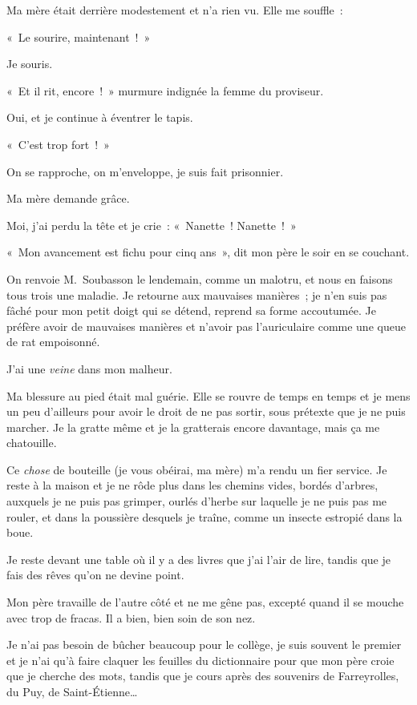 \documentclass[french,twoside]{book} %
\begin{document}
Ma mère était derrière modestement et n’a rien vu. Elle me souffle :\par
« Le sourire, maintenant ! »\par
Je souris.\par
« Et il rit, encore ! » murmure indignée la femme du proviseur.\par
Oui, et je continue à éventrer le tapis.\par
« C’est trop fort ! »\par
On se rapproche, on m’enveloppe, je suis fait prisonnier.\par
Ma mère demande grâce.\par
Moi, j’ai perdu la tête et je crie : « Nanette ! Nanette ! »\par
« Mon avancement est fichu pour cinq ans », dit mon père le soir en se couchant.\par
On renvoie M. Soubasson le lendemain, comme un malotru, et nous en faisons tous trois une maladie. Je retourne aux mauvaises manières ; je n’en suis pas fâché pour mon petit doigt qui se détend, reprend sa forme accoutumée. Je préfère avoir de mauvaises manières et n’avoir pas l’auriculaire comme une queue de rat empoisonné.\par
\bigbreak
\noindent J’ai une \emph{veine} dans mon malheur.\par
Ma blessure au pied était mal guérie. Elle se rouvre de temps en temps et je mens un peu d’ailleurs pour avoir le droit de ne pas sortir, sous prétexte que je ne puis marcher. Je la gratte même et je la gratterais encore davantage, mais ça me chatouille.\par
Ce\emph{ chose} de bouteille (je vous obéirai, ma mère) m’a rendu un fier service. Je reste à la maison et je ne rôde plus dans les chemins vides, bordés d’arbres, auxquels je ne puis pas grimper, ourlés d’herbe sur laquelle je ne puis pas me rouler, et dans la poussière desquels je traîne, comme un insecte estropié dans la boue.\par
Je reste devant une table où il y a des livres que j’ai l’air de lire, tandis que je fais des rêves qu’on ne devine point.\par
Mon père travaille de l’autre côté et ne me gêne pas, excepté quand il se mouche avec trop de fracas. Il a bien, bien soin de son nez.\par
Je n’ai pas besoin de bûcher beaucoup pour le collège, je suis souvent le premier et je n’ai qu’à faire claquer les feuilles du dictionnaire pour que mon père croie que je cherche des mots, tandis que je cours après des souvenirs de Farreyrolles, du Puy, de Saint-Étienne…\par
\end{document}

